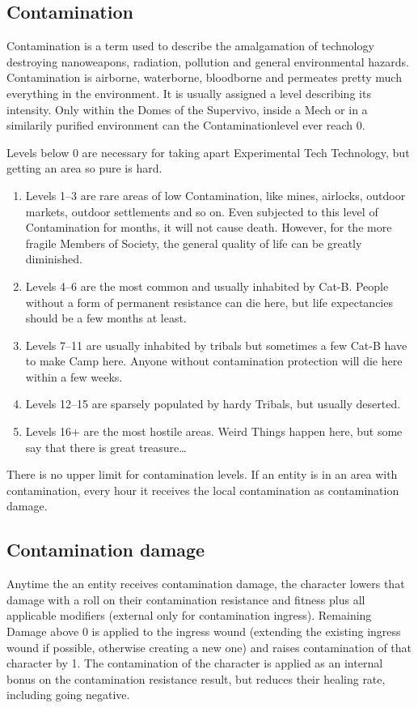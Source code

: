 \subsection{Contamination}\label{subsec:contamination}
Contamination is a term used to describe the amalgamation of \-technology destroying \-nanoweapons, \-radiation, \-pollution
and general \-environmental \-hazards.
Contamination is air\-borne, waterborne, bloodborne and per\-meates pretty much everything in the environment.
It is usually assigned a \-level \-describing its intensity.
Only within the Domes of the Supervivo, \-inside a Mech or in a similarily \-purified environment can the \-
Contamination\-level ever reach 0. \par
Levels below 0 are necessary for taking apart Experimental Tech Technology, but getting an area so pure is hard.\par
\begin{enumerate}[label = - ]
\item Levels 1--3
are rare areas of low Contamination, like mines, airlocks, outdoor markets, outdoor settlements and so on.
Even subjected to this level of Contamination for months, it will not cause death.
However, for the more fragile Members of Society, the general quality of life can be greatly diminished.
\item Levels 4--6
are the most common and usually inhabited by Cat-B\@.
People without a form of permanent resistance can die here, but life expectancies should be a few months at least.
\item Levels 7--11
are usually inhabited by tribals but sometimes a few Cat-B have to make Camp here.
Anyone without contamination protection will die here within a few weeks.
\item Levels 12--15
are sparsely populated by hardy Tribals, but usually deserted.
\item Levels 16+
are the most hostile areas.
Weird Things happen here, but some say that there is great treasure\ldots
\end{enumerate}
There is no upper limit for contamination levels.
If an entity is in an area with contamination, every hour it receives the local contamination
as contamination damage.\par
\subsection{Contamination damage}\label{subsec:contamination-damage}
Anytime the an entity receives contamination damage, the character lowers that damage with a roll on their contamination
resistance and fitness plus all applicable modifiers (external only for contamination ingress).
Remaining Damage above 0 is applied to the ingress wound (extending the existing ingress wound if possible,
otherwise creating a new one) and raises contamination of that character by 1.
The contamination of the character is applied as an internal bonus on the contamination resistance result, but reduces
their healing rate, including going negative.

